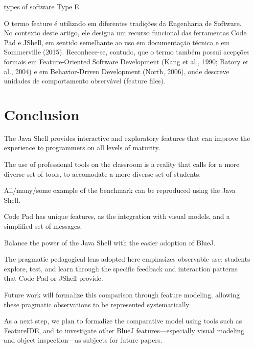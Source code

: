 \documentclass{article}
\begin{document}
types of software 
Type E

O termo feature é utilizado em diferentes tradições da Engenharia de Software. No contexto deste artigo, ele designa um recurso funcional das ferramentas Code Pad e JShell, em sentido semelhante ao uso em documentação técnica e em Sommerville (2015).
Reconhece-se, contudo, que o termo também possui acepções formais em Feature-Oriented Software Development (Kang et al., 1990; Batory et al., 2004) e em Behavior-Driven Development (North, 2006), onde descreve unidades de comportamento observável (feature files).

\section{Conclusion}

The Java Shell provides interactive and exploratory features that can improve the experience to programmers on all levels of maturity.

The use of professional tools on the classroom is a reality that calls for a more diverse set of tools, to accomodate a more diverse set of students.

All/many/some example of the benchmark can be reproduced using the Java Shell.

Code Pad has unique features, as the integration with visual models, and a simplified set of messages. 


Balance the power of the Java Shell with the easier adoption of BlueJ.

The pragmatic pedagogical lens adopted here emphasizes observable use: students explore, test, and learn through the specific feedback and interaction patterns that Code Pad or JShell provide.

Future work will formalize this comparison through feature modeling, allowing these pragmatic observations to be represented systematically

As a next step, we plan to formalize the comparative model using tools such as FeatureIDE, and to investigate other BlueJ features—especially visual modeling and object inspection—as subjects for future papers.





\end{document}
